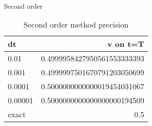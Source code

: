 \documentclass[10pt]{beamer}
\begin{document}
\begin{frame}{Second order}
  \begin{table}
    \caption{Second order method precision}
    \begin{tabular}{lr}
      \toprule
      dt & v on t=T\\
      \midrule
      0.01 & 0.4999958427950561553333393\\
      0.001 & 0.4999997501670791203050699\\
      0.0001 & 0.5000000000000019454031067\\
      0.00001 & 0.5000000000000000000194509\\
      \midrule
      exact & 0.5 \\
      \bottomrule
    \end{tabular}
  \end{table}
\end{frame}
\end{document}
